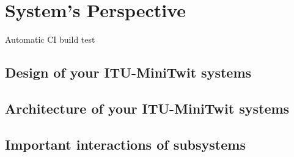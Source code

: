 \section{System's Perspective}
Automatic CI build test

\subsection{Design of your ITU-MiniTwit systems}
\subsection{Architecture of your ITU-MiniTwit systems}
\subsection{Important interactions of subsystems}
